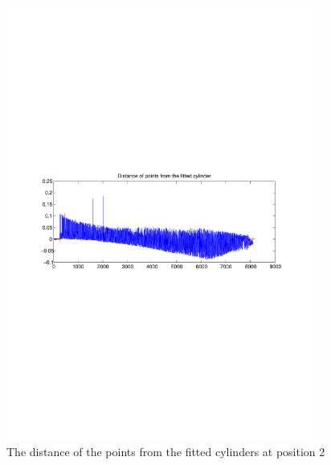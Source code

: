 \begin{figure}[htbp]
    \centering
    \includegraphics[width=0.9\textwidth]{pics/pos21-control-tof-dist}
    \caption{The distance of the points from the fitted cylinders at position 2}
    \label{chap7:fig-pos21-control-tof-dits}
\end{figure}
